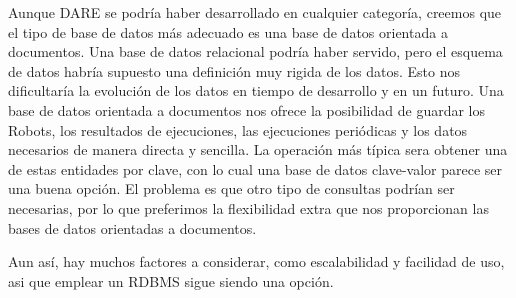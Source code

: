 Aunque DARE se podría haber desarrollado en cualquier categoría,
creemos que el tipo de base de datos más adecuado es una base de datos
orientada a documentos. Una base de datos relacional podría haber
servido, pero el esquema de datos habría supuesto una definición muy
rigida de los datos. Esto nos dificultaría la evolución de los datos
en tiempo de desarrollo y en un futuro. Una base de datos orientada a
documentos nos ofrece la posibilidad de guardar los Robots, los
resultados de ejecuciones, las ejecuciones periódicas y los datos
necesarios de manera directa y sencilla. La operación más típica sera
obtener una de estas entidades por clave, con lo cual una base de
datos clave-valor parece ser una buena opción. El problema es que otro
tipo de consultas podrían ser necesarias, por lo que preferimos la
flexibilidad extra que nos proporcionan las bases de datos orientadas
a documentos.

Aun así, hay muchos factores a considerar, como escalabilidad y
facilidad de uso, asi que emplear un RDBMS sigue siendo una opción.

